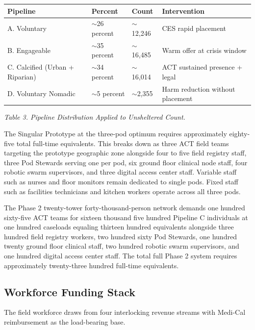 \documentclass[12pt, letterpaper]{article}
\begin{document}
{\singlespacing
\begin{tabularx}{\textwidth}{@{}lXll@{}}
\toprule
\rowcolor{rowgray}
Pipeline & Percent & Count & Intervention \\
\midrule
A. Voluntary & $\sim$26 percent & $\sim$12,246 & CES rapid placement \\
\rowcolor{rowgray}
B. Engageable & $\sim$35 percent & $\sim$16,485 & Warm offer at crisis window \\
C. Calcified (Urban + Riparian) & $\sim$34 percent & $\sim$16,014 & ACT sustained presence + legal \\
\rowcolor{rowgray}
D. Voluntary Nomadic & $\sim$5 percent & $\sim$2,355 & Harm reduction without placement \\
\bottomrule
\end{tabularx}\par
\vspace{8pt}
\noindent\textit{Table 3. Pipeline Distribution Applied to Unsheltered Count.}
\par}
The Singular Prototype at the three-pod optimum requires approximately eighty-five total full-time equivalents. This breaks down as three ACT field teams targeting the prototype geographic zone alongside four to five field registry staff, three Pod Stewards serving one per pod, six ground floor clinical node staff, four robotic swarm supervisors, and three digital access center staff. Variable staff such as nurses and floor monitors remain dedicated to single pods. Fixed staff such as facilities technicians and kitchen workers operate across all three pods.

The Phase 2 twenty-tower forty-thousand-person network demands one hundred sixty-five ACT teams for sixteen thousand five hundred Pipeline C individuals at one hundred caseloads equaling thirteen hundred equivalents alongside three hundred field registry workers, two hundred sixty Pod Stewards, one hundred twenty ground floor clinical staff, two hundred robotic swarm supervisors, and one hundred digital access center staff. The total full Phase 2 system requires approximately twenty-three hundred full-time equivalents.

\clearpage

\subsection{Workforce Funding Stack}

The field workforce draws from four interlocking revenue streams with Medi-Cal reimbursement as the load-bearing base.
\end{document}
